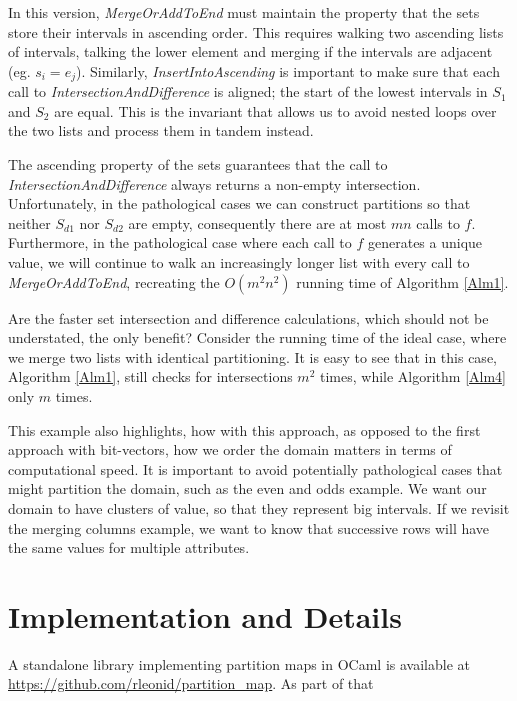 \documentclass{article}
\begin{document}
In this version, \emph{MergeOrAddToEnd} must maintain the property that the
sets store their intervals in ascending order.
This requires walking two ascending lists of intervals,
talking the lower element and merging if the intervals are adjacent
(eg. $s_{i} = e_{j}$).
Similarly, \emph{InsertIntoAscending} is important to make sure that each
call to \emph{IntersectionAndDifference} is aligned;
the start of the lowest intervals in $S_{1}$ and $S_{2}$ are equal.
This is the invariant that allows us to avoid nested loops over the two lists
and process them in tandem instead.

The ascending property of the sets guarantees that the call to
\emph{IntersectionAndDifference} always returns a non-empty intersection.
Unfortunately,
in the pathological cases we can construct partitions so that
neither $S_{d1}$ nor $S_{d2}$ are empty,
consequently there are at most $mn$ calls to $f$.
Furthermore,
in the pathological case where each call to $f$ generates a unique value,
we will continue to walk an increasingly longer list with every call to
\emph{MergeOrAddToEnd},
recreating the $O(m^{2}n^{2})$ running time of Algorithm \ref{Alm1}.

Are the faster set intersection and difference calculations,
which should not be understated,
the only benefit?
Consider the running time of the ideal case,
where we merge two lists with identical partitioning.
It is easy to see that in this case,
Algorithm \ref{Alm1},
still checks for intersections $m^{2}$ times,
while Algorithm \ref{Alm4} only $m$ times.

This example also highlights,
how with this approach,
as opposed to the first approach with bit-vectors,
how we order the domain matters in terms of computational speed.
It is important to avoid potentially pathological cases that might
partition the domain, such as the even and odds example.
We want our domain to have clusters of value,
so that they represent big intervals.
If we revisit the merging columns example,
we want to know that successive rows will have the same values for
multiple attributes.

\section{Implementation and Details}

A standalone library implementing partition maps in OCaml\cite{ocaml-manual}
is available at \url{https://github.com/rleonid/partition_map}.
As part of that
\end{document}
